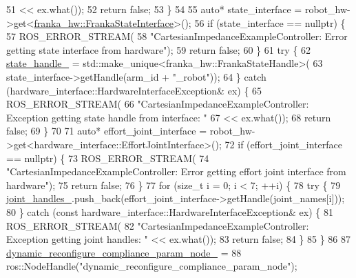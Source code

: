 \begin{DoxyCode}
51         << ex.what());
52     \textcolor{keywordflow}{return} \textcolor{keyword}{false};
53   \}
54 
55   \textcolor{keyword}{auto}* state\_interface = robot\_hw->get<\hyperlink{classfranka__hw_1_1FrankaStateInterface}{franka\_hw::FrankaStateInterface}>();
56   \textcolor{keywordflow}{if} (state\_interface == \textcolor{keyword}{nullptr}) \{
57     ROS\_ERROR\_STREAM(
58         \textcolor{stringliteral}{"CartesianImpedanceExampleController: Error getting state interface from hardware"});
59     \textcolor{keywordflow}{return} \textcolor{keyword}{false};
60   \}
61   \textcolor{keywordflow}{try} \{
62     \hyperlink{classfranka__example__controllers_1_1CartesianImpedanceExampleController_affdc57722887831ee0e3e02332eae345}{state\_handle\_} = std::make\_unique<franka\_hw::FrankaStateHandle>(
63         state\_interface->getHandle(arm\_id + \textcolor{stringliteral}{"\_robot"}));
64   \} \textcolor{keywordflow}{catch} (hardware\_interface::HardwareInterfaceException& ex) \{
65     ROS\_ERROR\_STREAM(
66         \textcolor{stringliteral}{"CartesianImpedanceExampleController: Exception getting state handle from interface: "}
67         << ex.what());
68     \textcolor{keywordflow}{return} \textcolor{keyword}{false};
69   \}
70 
71   \textcolor{keyword}{auto}* effort\_joint\_interface = robot\_hw->get<hardware\_interface::EffortJointInterface>();
72   \textcolor{keywordflow}{if} (effort\_joint\_interface == \textcolor{keyword}{nullptr}) \{
73     ROS\_ERROR\_STREAM(
74         \textcolor{stringliteral}{"CartesianImpedanceExampleController: Error getting effort joint interface from hardware"});
75     \textcolor{keywordflow}{return} \textcolor{keyword}{false};
76   \}
77   \textcolor{keywordflow}{for} (\textcolor{keywordtype}{size\_t} i = 0; i < 7; ++i) \{
78     \textcolor{keywordflow}{try} \{
79       \hyperlink{classfranka__example__controllers_1_1CartesianImpedanceExampleController_a288ac917280b160d8a531ab3554de5e4}{joint\_handles\_}.push\_back(effort\_joint\_interface->getHandle(joint\_names[i]));
80     \} \textcolor{keywordflow}{catch} (\textcolor{keyword}{const} hardware\_interface::HardwareInterfaceException& ex) \{
81       ROS\_ERROR\_STREAM(
82           \textcolor{stringliteral}{"CartesianImpedanceExampleController: Exception getting joint handles: "} << ex.what());
83       \textcolor{keywordflow}{return} \textcolor{keyword}{false};
84     \}
85   \}
86 
87   \hyperlink{classfranka__example__controllers_1_1CartesianImpedanceExampleController_a5c360df35cb2e4e32b47746a40ed95b1}{dynamic\_reconfigure\_compliance\_param\_node\_} =
88       ros::NodeHandle(\textcolor{stringliteral}{"dynamic\_reconfigure\_compliance\_param\_node"});

\end{DoxyCode}
